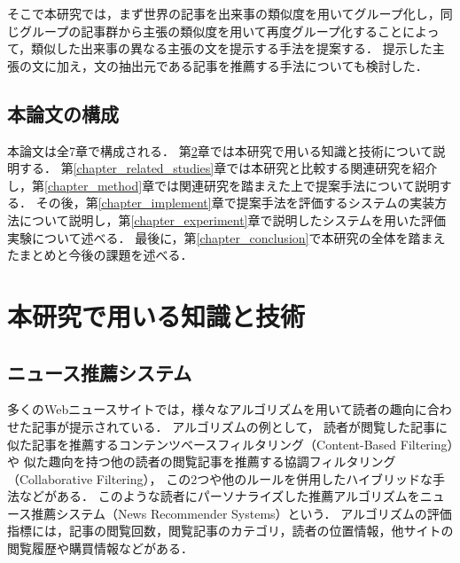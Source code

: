 \documentclass[12pt,a4j]{jreport}
\begin{document}


そこで本研究では，まず世界の記事を出来事の類似度を用いてグループ化し，同じグループの記事群から主張の類似度を用いて再度グループ化することによって，類似した出来事の異なる主張の文を提示する手法を提案する．
提示した主張の文に加え，文の抽出元である記事を推薦する手法についても検討した．



\section{本論文の構成}
本論文は全7章で構成される．
第\ref{chapter_knowledge_and_technologies}章では本研究で用いる知識と技術について説明する．
第\ref{chapter_related_studies}章では本研究と比較する関連研究を紹介し，第\ref{chapter_method}章では関連研究を踏まえた上で提案手法について説明する．
その後，第\ref{chapter_implement}章で提案手法を評価するシステムの実装方法について説明し，第\ref{chapter_experiment}章で説明したシステムを用いた評価実験について述べる．
最後に，第\ref{chapter_conclusion}で本研究の全体を踏まえたまとめと今後の課題を述べる．

\chapter{本研究で用いる知識と技術}
\label{chapter_knowledge_and_technologies}
\section{ニュース推薦システム}
多くのWebニュースサイトでは，様々なアルゴリズムを用いて読者の趣向に合わせた記事が提示されている．
アルゴリズムの例として，
読者が閲覧した記事に似た記事を推薦するコンテンツベースフィルタリング（Content-Based Filtering）や
似た趣向を持つ他の読者の閲覧記事を推薦する協調フィルタリング（Collaborative Filtering），
この2つや他のルールを併用したハイブリッドな手法などがある\cite{karimi_news_2018}．
このような読者にパーソナライズした推薦アルゴリズムをニュース推薦システム（News Recommender Systems）という．
アルゴリズムの評価指標には，記事の閲覧回数，閲覧記事のカテゴリ，読者の位置情報，他サイトの閲覧履歴や購買情報などがある．
\end{document}

